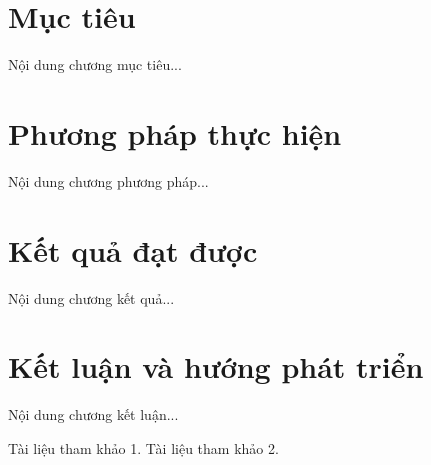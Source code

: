 \documentclass[a4paper,12pt]{report}  %
\begin{document}
\chapter{Mục tiêu}
Nội dung chương mục tiêu...

\chapter{Phương pháp thực hiện}
Nội dung chương phương pháp...

\chapter{Kết quả đạt được}
Nội dung chương kết quả...

\chapter{Kết luận và hướng phát triển}
Nội dung chương kết luận...

\begin{thebibliography}{9}
     Tài liệu tham khảo 1.
     Tài liệu tham khảo 2.
\end{thebibliography}
\end{document}
